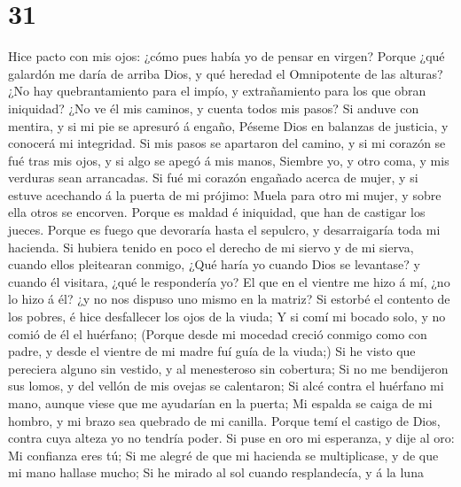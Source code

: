 \hypertarget{section-30}{%
\section{31}\label{section-30}}

 Hice pacto con mis ojos: ¿cómo pues había yo de pensar en
virgen?  Porque ¿qué galardón me daría de arriba Dios, y
qué heredad el Omnipotente de las alturas?  ¿No hay
quebrantamiento para el impío, y extrañamiento para los que obran
iniquidad?  ¿No ve él mis caminos, y cuenta todos mis
pasos?  Si anduve con mentira, y si mi pie se apresuró á
engaño,  Péseme Dios en balanzas de justicia, y conocerá
mi integridad.  Si mis pasos se apartaron del camino, y si
mi corazón se fué tras mis ojos, y si algo se apegó á mis manos,
 Siembre yo, y otro coma, y mis verduras sean arrancadas.
 Si fué mi corazón engañado acerca de mujer, y si estuve
acechando á la puerta de mi prójimo:  Muela para otro mi
mujer, y sobre ella otros se encorven.  Porque es maldad
é iniquidad, que han de castigar los jueces.  Porque es
fuego que devoraría hasta el sepulcro, y desarraigaría toda mi hacienda.
 Si hubiera tenido en poco el derecho de mi siervo y de
mi sierva, cuando ellos pleitearan conmigo,  ¿Qué haría
yo cuando Dios se levantase? y cuando él visitara, ¿qué le respondería
yo?  El que en el vientre me hizo á mí, ¿no lo hizo á él?
¿y no nos dispuso uno mismo en la matriz?  Si estorbé el
contento de los pobres, é hice desfallecer los ojos de la viuda;
 Y si comí mi bocado solo, y no comió de él el huérfano;
 (Porque desde mi mocedad creció conmigo como con padre,
y desde el vientre de mi madre fuí guía de la viuda;)  Si
he visto que pereciera alguno sin vestido, y al menesteroso sin
cobertura;  Si no me bendijeron sus lomos, y del vellón
de mis ovejas se calentaron;  Si alcé contra el huérfano
mi mano, aunque viese que me ayudarían en la puerta;  Mi
espalda se caiga de mi hombro, y mi brazo sea quebrado de mi canilla.
 Porque temí el castigo de Dios, contra cuya alteza yo no
tendría poder.  Si puse en oro mi esperanza, y dije al
oro: Mi confianza eres tú;  Si me alegré de que mi
hacienda se multiplicase, y de que mi mano hallase mucho;
 Si he mirado al sol cuando resplandecía, y á la luna

